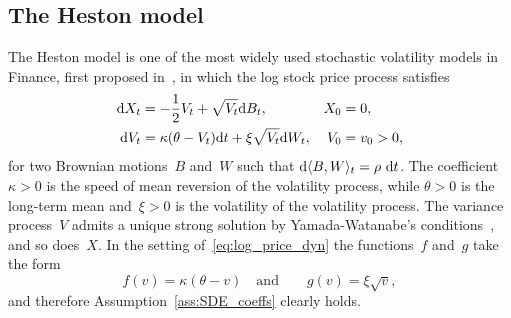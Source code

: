 \subsection{The Heston model}\label{sec:Heston}

The Heston model is one of the most widely used stochastic volatility models in Finance, first proposed in~\cite{Heston1993AOptions}, in which the log stock price process satisfies
\begin{equation}\label{eq:Heston}
\begin{aligned}
    \mathrm{d} X_t &= -\frac12 V_t + \sqrt{V_t}\mathrm{d} B_t, & X_0 &= 0,\\
    \mathrm{d} V_t &= \kappa (\theta - V_t)\mathrm{d} t + \xi \sqrt{V_t}\mathrm{d} W_t, & V_0 &= v_0 > 0,
\end{aligned}
\end{equation}
for two Brownian motions~$B$ and~$W$
such that $\D\langle B, W\rangle_{t} = \rho \ \D t$. 
The coefficient $\kappa>0$ is the speed of mean reversion of the volatility process, 
while $\theta>0$ is the long-term mean 
and~$\xi>0$ is the volatility of the volatility process.
The variance process~$V$ admits a unique strong solution by Yamada-Watanabe's conditions~\cite[Proposition 2.13]{Karatzas1998BrownianCalculus}, and so does~$X$.
In the setting of~\eqref{eq:log_price_dyn}
the functions~$f$ and~$g$ take the form
$$
f(v) = \kappa(\theta - v)
\quad\text{and}\qquad
g(v) = \xi\sqrt{v},
$$
and therefore Assumption~\ref{ass:SDE_coeffs} clearly holds.
